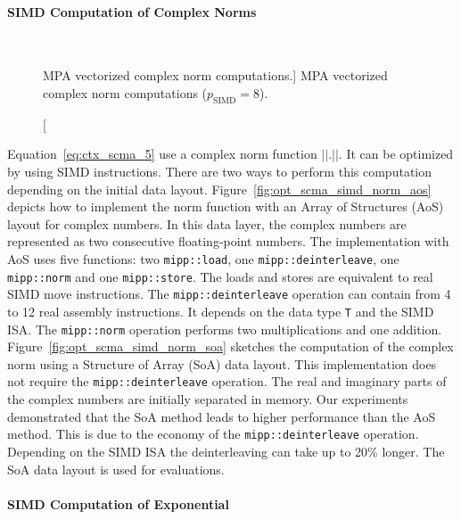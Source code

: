 \paragraph{SIMD Computation of Complex Norms}

\begin{figure}[htp]
  \centering
  \\
  \caption
    [MPA vectorized complex norm computations.]
    {MPA vectorized complex norm computations ($p_\text{SIMD} = 8$).}
  \label{fig:opt_scma_simd_norm}
\end{figure}

Equation~\ref{eq:ctx_scma_5} use a complex norm function $||.||$. It can be
optimized by using SIMD instructions. There are two ways to perform this
computation depending on the initial data layout.
Figure~\ref{fig:opt_scma_simd_norm_aos} depicts how to implement the norm
function with an Array of Structures (AoS) layout for complex numbers. In this
data layer, the complex numbers are represented as two consecutive
floating-point numbers. The implementation with AoS uses five \MIPP functions:
two \verb|mipp::load|, one \verb|mipp::deinterleave|, one \verb|mipp::norm| and
one \verb|mipp::store|. The \MIPP loads and stores are equivalent to real SIMD
move instructions. The \verb|mipp::deinterleave| operation can contain from 4 to
12 real assembly instructions. It depends on the data type \verb|T| and the SIMD
ISA. The \verb|mipp::norm| operation performs two multiplications and one
addition. Figure~\ref{fig:opt_scma_simd_norm_soa} sketches the computation of
the complex norm using a Structure of Array (SoA) data layout. This
implementation does not require the \MIPP \verb|mipp::deinterleave| operation.
The real and imaginary parts of the complex numbers are initially separated in
memory. Our experiments demonstrated that the SoA method leads to higher
performance than the AoS method. This is due to the economy of the
\verb|mipp::deinterleave| operation. Depending on the SIMD ISA the
deinterleaving can take up to 20\% longer. The SoA data layout is used for
evaluations.

\paragraph{SIMD Computation of Exponential}

